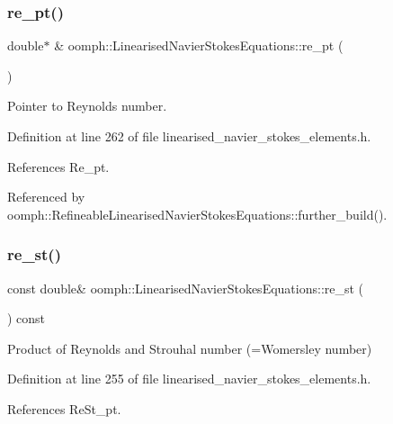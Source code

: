 \subsubsection{\texorpdfstring{re\+\_\+pt()}{re\_pt()}}
{\footnotesize\ttfamily double$\ast$ \& oomph\+::\+Linearised\+Navier\+Stokes\+Equations\+::re\+\_\+pt (\begin{DoxyParamCaption}{ }\end{DoxyParamCaption})\hspace{0.3cm}{\ttfamily [inline]}}



Pointer to Reynolds number. 



Definition at line 262 of file linearised\+\_\+navier\+\_\+stokes\+\_\+elements.\+h.



References Re\+\_\+pt.



Referenced by oomph\+::\+Refineable\+Linearised\+Navier\+Stokes\+Equations\+::further\+\_\+build().

\mbox{\label{classoomph_1_1LinearisedNavierStokesEquations_a4b56a1b8376f110d64852ab2b9c64696}} 
\subsubsection{\texorpdfstring{re\+\_\+st()}{re\_st()}}
{\footnotesize\ttfamily const double\& oomph\+::\+Linearised\+Navier\+Stokes\+Equations\+::re\+\_\+st (\begin{DoxyParamCaption}{ }\end{DoxyParamCaption}) const\hspace{0.3cm}{\ttfamily [inline]}}



Product of Reynolds and Strouhal number (=Womersley number) 



Definition at line 255 of file linearised\+\_\+navier\+\_\+stokes\+\_\+elements.\+h.



References Re\+St\+\_\+pt.



